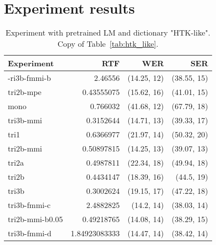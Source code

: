 \chapter{Experiment results}
\label{cha:results}

\begin{table}[!htp]\label{tab:htk_like_copy}\centering\begin{tabular}{l|rrr}
Experiment      & \ac{RTF}       & \ac{WER}         & \ac{SER} \\
\hline
-ri3b-fmmi-b    & 2.46556       & (14.25, 12) & (38.55, 15)\\ 
tri2b-mpe       & 0.43555075    & (15.62, 16) & (41.01, 15)\\ 
mono            & 0.766032      & (41.68, 12) & (67.79, 18)\\ 
tri3b-mmi       & 0.3152644     & (14.71, 13) & (39.33, 17)\\ 
tri1            & 0.6366977     & (21.97, 14) & (50.32, 20)\\ 
tri2b-mmi       & 0.50897815    & (14.25, 13) & (39.07, 13)\\ 
tri2a           & 0.4987811     & (22.34, 18) & (49.94, 18)\\ 
tri2b           & 0.4434147     & (18.39, 16) & (44.5, 19) \\ 
tri3b           & 0.3002624     & (19.15, 17) & (47.22, 18)\\ 
tri3b-fmmi-c    & 2.4882825     & (14.2, 14)  & (38.03, 14)\\ 
tri2b-mmi-b0.05 & 0.49218765    & (14.08, 14) & (38.29, 15)\\ 
tri3b-fmmi-d    & 1.84923083333 & (14.47, 14) & (38.42, 14)
\end{tabular}
\caption{Experiment with pretrained LM and dictionary "\ac{HTK}-like". Copy of Table~\ref{tab:htk_like}.}
\end{table}  

